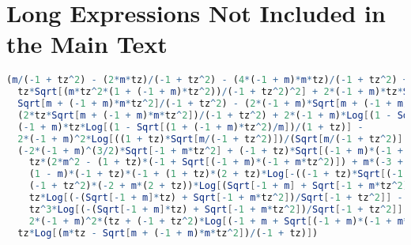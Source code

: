\chapter{Long Expressions Not Included in the Main Text\label{cha:long_expression}}
\begin{lstlisting}[breaklines=true, caption={Expression for Type-II interband transition with \( t_z > 1 \), given in Mathematica format.\label{lst:typeii-interband-tzpos}},language=Mathematica]
(m/(-1 + tz^2) - (2*m*tz)/(-1 + tz^2) - (4*(-1 + m)*m*tz)/(-1 + tz^2) + (m*tz^2)/(-1 + tz^2) +
  tz*Sqrt[(m*tz^2*(1 + (-1 + m)*tz^2))/(-1 + tz^2)^2] + 2*(-1 + m)*tz*Sqrt[(m*tz^2*(1 + (-1 + m)*tz^2))/(-1 + tz^2)^2] -
  Sqrt[m + (-1 + m)*m*tz^2]/(-1 + tz^2) - (2*(-1 + m)*Sqrt[m + (-1 + m)*m*tz^2])/(-1 + tz^2) +
  (2*tz*Sqrt[m + (-1 + m)*m*tz^2])/(-1 + tz^2) + 2*(-1 + m)*Log[(1 - Sqrt[(1 + (-1 + m)*tz^2)/m])/(1 + tz)] +
  (-1 + m)*tz*Log[(1 - Sqrt[(1 + (-1 + m)*tz^2)/m])/(1 + tz)] -
  2*(-1 + m)^2*Log[((1 + tz)*Sqrt[m/(-1 + tz^2)])/(Sqrt[m/(-1 + tz^2)] - Sqrt[(1 + (-1 + m)*tz^2)/(-1 + tz^2)])] -
  (-2*(-1 + m)^(3/2)*Sqrt[-1 + m*tz^2] + (-1 + tz)*Sqrt[(-1 + m)*(-1 + m*tz^2)] -
    tz*(2*m^2 - (1 + tz)*(-1 + Sqrt[(-1 + m)*(-1 + m*tz^2)]) + m*(-3 + tz*(-1 + 2*Sqrt[(-1 + m)*(-1 + m*tz^2)]))) -
    (1 - m)*(-1 + tz)*(-1 + (1 + tz)*(2 + tz)*Log[-((-1 + tz)*Sqrt[(-1 + m)/(-1 + tz^2)])]) -
    (-1 + tz^2)*(-2 + m*(2 + tz))*Log[(Sqrt[-1 + m] + Sqrt[-1 + m*tz^2])/Sqrt[-1 + tz^2]] +
    tz*Log[(-(Sqrt[-1 + m]*tz) + Sqrt[-1 + m*tz^2])/Sqrt[-1 + tz^2]] -
    tz^3*Log[(-(Sqrt[-1 + m]*tz) + Sqrt[-1 + m*tz^2])/Sqrt[-1 + tz^2]] -
    2*(-1 + m)^2*(tz + (-1 + tz^2)*Log[(-1 + m + Sqrt[(-1 + m)*(-1 + m*tz^2)])/(-1 + m + tz - m*tz)]))/(-1 + tz^2) -
  tz*Log[(m*tz - Sqrt[m + (-1 + m)*m*tz^2])/(-1 + tz)])
\end{lstlisting}


